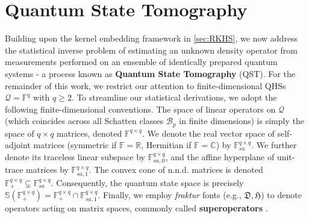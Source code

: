 \documentclass[noinfoline]{imsart}\setcounter{tocdepth}{2}
\renewcommand{\b}[1]{\mathbb{#1}} %
\newcommand{\f}[1]{\mathfrak{#1}} %
\renewcommand{\c}[1]{\mathcal{#1}} %
\theoremstyle{plain}
\begin{document}
\section{Quantum State Tomography}\label{sec:QKT}
Building upon the kernel embedding framework in \cref{sec:RKHS}, we now address the statistical inverse problem of estimating an unknown density operator from measurements performed on an ensemble of identically prepared quantum systems - a process known as \textbf{Quantum State Tomography} (QST).
For the remainder of this work, we restrict our attention to finite-dimensional QHSs $\c{Q} = \b{F}^{q}$ with $q \ge 2$. To streamline our statistical derivations, we adopt the following finite-dimensional conventions. The space of linear operators on $\c{Q}$ (which coincides across all Schatten classes $\c{B}_{p}$ in finite dimensions) is simply the space of $q \times q$ matrices, denoted $\b{F}^{q \times q}$. We denote the real vector space of self-adjoint matrices (symmetric if $\b{F}=\b{R}$, Hermitian if $\b{F}=\b{C}$) by $\b{F}_{sa}^{q \times q}$. We further denote its traceless linear subspace by $\b{F}_{sa, 0}^{q \times q}$, and the affine hyperplane of unit-trace matrices by $\b{F}_{sa, 1}^{q \times q}$. The convex cone of n.n.d. matrices is denoted $\b{F}_{+}^{q \times q} \subsetneq \b{F}_{sa}^{q \times q}$. Consequently, the quantum state space is precisely $\b{S}(\b{F}_{+}^{q \times q}) = \b{F}_{+}^{q \times q} \cap \b{F}_{sa, 1}^{q \times q}$.
Finally, we employ \emph{fraktur} fonts (e.g., $\f{D}, \f{H}$) to denote operators acting on matrix spaces, commonly called \textbf{superoperators} \cite{scott2006tight}.
\end{document}
